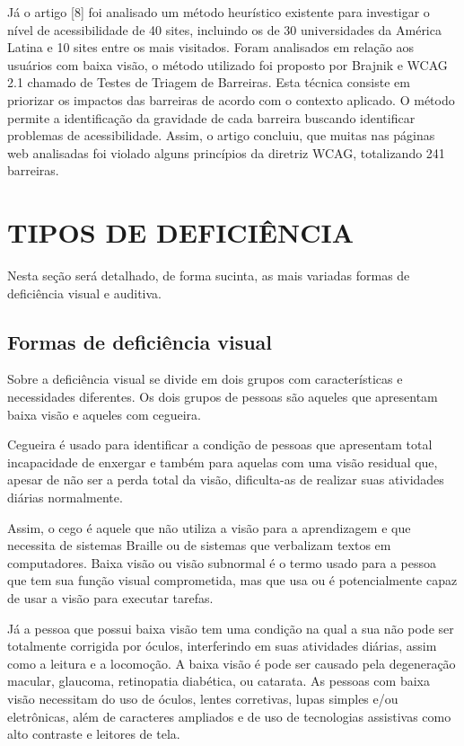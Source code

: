 \documentclass[a4paper]{article}
\begin{document}
\begin{titlepage}
Já o artigo [8] foi analisado um método heurístico existente para investigar o nível de acessibilidade de 40 sites, incluindo os de 30 universidades da América Latina e 10 sites entre os mais visitados. Foram analisados em relação aos usuários com baixa visão, o método utilizado foi proposto por Brajnik e WCAG 2.1 chamado de Testes de Triagem de Barreiras. Esta técnica consiste em priorizar os impactos das barreiras de acordo com o contexto aplicado. O método permite a identificação da gravidade de cada barreira buscando identificar problemas de acessibilidade. Assim, o artigo concluiu, que muitas nas páginas web analisadas foi violado alguns princípios da diretriz WCAG, totalizando 241 barreiras.

\section{TIPOS DE DEFICIÊNCIA}
Nesta seção será detalhado, de forma sucinta, as mais variadas formas de deficiência visual e auditiva.

\subsection{Formas de deficiência visual}
Sobre a deficiência visual se divide em dois grupos com características e necessidades diferentes. Os dois grupos de pessoas são aqueles que apresentam baixa visão e aqueles com cegueira.

Cegueira é usado para identificar a condição de pessoas que apresentam total incapacidade de enxergar e também para aquelas com uma visão residual que, apesar de não ser a perda total da visão, dificulta-as de realizar suas atividades diárias normalmente.

Assim, o cego é aquele que não utiliza a visão para a aprendizagem e que necessita de sistemas Braille ou de sistemas que verbalizam textos em computadores. Baixa visão ou visão subnormal é o termo usado para a pessoa que tem sua função visual comprometida, mas que usa ou é potencialmente capaz de usar a visão para executar tarefas.

Já a pessoa que possui baixa visão tem uma condição na qual a sua não pode ser totalmente corrigida por óculos, interferindo em suas atividades diárias, assim como a leitura e a locomoção. A baixa visão é pode ser causado pela degeneração macular, glaucoma, retinopatia diabética, ou catarata. As pessoas com baixa visão necessitam do uso de óculos, lentes corretivas, lupas simples e/ou eletrônicas, além de caracteres ampliados e de uso de tecnologias assistivas como alto contraste e leitores de tela.


\end{titlepage}
\end{document}

